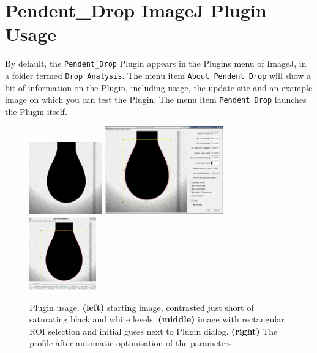 \documentclass[fleqn]{scrartcl}
\newcommand{\gouttependante}{\texttt{Pendent\_Drop}\xspace}
\begin{document}
\section{Pendent\_Drop ImageJ Plugin Usage}
\label{sec:usage}

By default, the \gouttependante Plugin appears in the Plugins menu of
ImageJ, in a folder termed \texttt{Drop Analysis}. The menu item
\texttt{About Pendent Drop} will show a bit of information on the
Plugin, including usage, the update site and an example image on which
you can test the Plugin. The menu item \texttt{Pendent Drop} launches
the Plugin itself.

\begin{figure}
  \centering
  \includegraphics[width=0.28\textwidth]{eauContrasteMax}\hfill
  \includegraphics[width=0.455\textwidth]{eauContrasteMaxInitial}\hfill
  \includegraphics[width=0.258\textwidth]{eauContrasteMaxFit}
  \caption{Plugin usage. \textbf{(left)} starting image, contrasted
    just short of saturating black and white levels. \textbf{(middle)}
    image with rectangular ROI selection and initial guess next to
    Plugin dialog. \textbf{(right)} The profile after automatic
    optimisation of the parameters.}
  \label{fig:usage}
\end{figure}
\end{document}
